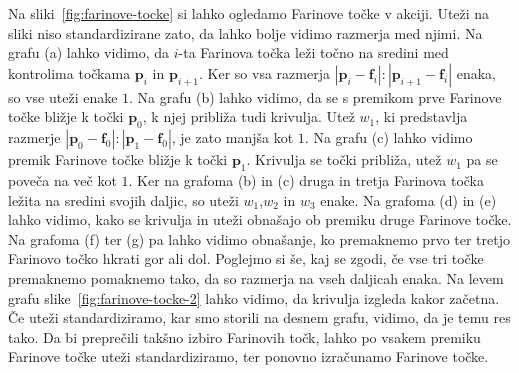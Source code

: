 \documentclass[isrm2, tisk]{fmfdelo}
\newcommand{\p}{\textbf{p}}
\begin{document}
    Na sliki~\ref{fig:farinove-tocke} si lahko ogledamo Farinove točke v akciji.
    Uteži na sliki niso standardizirane zato, da lahko bolje vidimo razmerja med njimi.
    Na grafu (a) lahko vidimo, da $i$-ta Farinova točka leži točno na sredini med kontrolima točkama $\p_i$ in $\p_{i+1}$.
    Ker so vsa razmerja $|\p_i-\mathbf{f}_i|:|\p_{i+1}-\mathbf{f}_i|$ enaka, so vse uteži enake $1$.
    Na grafu (b) lahko vidimo, da se s premikom prve Farinove točke bližje k točki $\p_0$, k njej približa tudi krivulja.
    Utež $w_1$, ki predstavlja razmerje $|\p_0-\mathbf{f}_0|:|\p_{1}-\mathbf{f}_0|$, je zato manjša kot $1$.
    Na grafu (c) lahko vidimo premik Farinove točke bližje k točki $\p_1$.
    Krivulja se točki približa, utež $w_1$ pa se poveča na več kot $1$.
    Ker na grafoma (b) in (c) druga in tretja Farinova točka ležita na sredini svojih daljic, so uteži $w_1$,$w_2$ in $w_3$ enake.
    Na grafoma (d) in (e) lahko vidimo, kako se krivulja in uteži obnašajo ob premiku druge Farinove točke.
    Na grafoma (f) ter (g) pa lahko vidimo obnašanje, ko premaknemo prvo ter tretjo Farinovo točko hkrati gor ali dol.
    Poglejmo si še, kaj se zgodi, če vse tri točke premaknemo pomaknemo tako, da so razmerja na vseh daljicah enaka.
    Na levem grafu slike~\ref{fig:farinove-tocke-2} lahko vidimo, da krivulja izgleda kakor začetna.
    Če uteži standardiziramo, kar smo storili na desnem grafu, vidimo, da je temu res tako.
    Da bi preprečili takšno izbiro Farinovih točk, lahko po vsakem premiku Farinove točke uteži standardiziramo, ter ponovno izračunamo Farinove točke.
\end{document}
